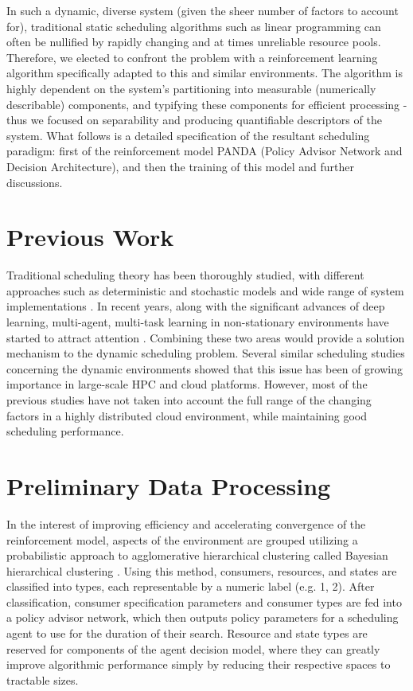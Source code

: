 \documentclass{article}
\theoremstyle{definition}
\theoremstyle{remark}
\begin{document}
	In such a dynamic, diverse system (given the sheer number of factors to account	for), traditional static scheduling algorithms such as linear programming can often be nullified by rapidly changing and at times unreliable resource pools. Therefore, we elected to confront the problem with a reinforcement learning algorithm specifically adapted to this and similar environments. The algorithm is highly dependent on the system's partitioning into measurable (numerically describable) components, and typifying these components for efficient processing - thus we focused on separability and producing quantifiable descriptors of the system. What follows is a detailed specification of the resultant scheduling paradigm: first of the reinforcement model PANDA (Policy Advisor Network and Decision Architecture), and then the training of this model and further discussions.


	\section{Previous Work}
	
	Traditional scheduling theory has been thoroughly studied, with different approaches such as deterministic and stochastic models and wide range of system implementations \cite{pinedo2016scheduling}. In recent years, along with the significant advances of deep learning, multi-agent, multi-task learning in non-stationary environments have started to attract attention \cite{al2017continuous, omidshafiei2017deep, foerster2016learning, tampuu2017multiagent, bansal2017emergent, frans2017meta}. Combining these two areas would provide a solution mechanism to the dynamic scheduling problem. Several similar scheduling studies concerning the dynamic environments \cite{tang2009fault, carastan2017obtaining} showed that this issue has been of growing importance in large-scale HPC and cloud platforms. However, most of the previous studies have not taken into account the full range of the changing factors in a highly distributed cloud environment, while maintaining good scheduling performance.
	
	\section{Preliminary Data Processing}
	
	In the interest of improving efficiency and accelerating convergence of the reinforcement model, aspects of the environment are grouped utilizing a probabilistic approach to agglomerative hierarchical clustering called Bayesian hierarchical clustering \cite{heller2005bayesian}. Using this method, consumers, resources, and states are classified into types, each representable by a numeric label (e.g. 1, 2). After classification, consumer specification parameters and consumer types are fed into a policy advisor network, which then outputs policy parameters for a scheduling agent to use for the duration of their search. Resource and state types are reserved for components of the agent decision model, where they can greatly improve algorithmic performance simply by reducing their respective spaces to tractable sizes.
\end{document}
